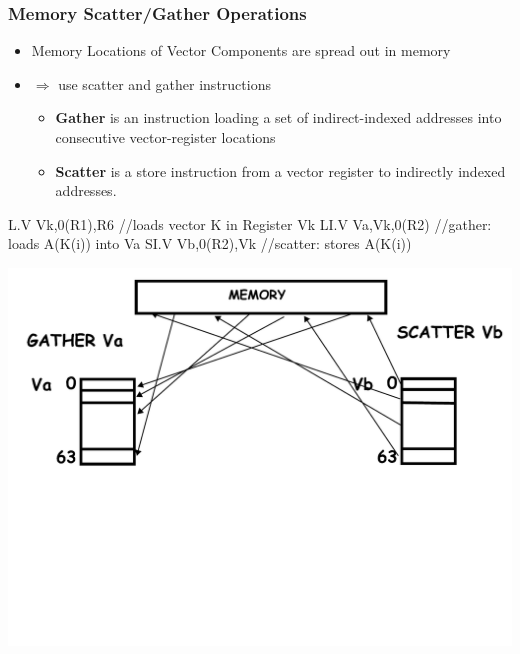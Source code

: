 \documentclass{beamer}
\newcommand{\emp}[1]{\textcolor{DikuRed}{ #1}}
\begin{document}
\begin{frame}[fragile,t]
\frametitle{Memory Scatter/Gather Operations}

\begin{itemize}
    \item Memory Locations of Vector Components are spread out in memory
    \item $\Rightarrow$ use scatter and gather instructions\medskip 
        \begin{itemize}
            \item \emp{\bf Gather} is an instruction loading a set of
                    indirect-indexed addresses into consecutive 
                    vector-register locations\smallskip
            \item \emp{\bf Scatter} is a store instruction from a vector
                    register to indirectly indexed addresses.
        \end  {itemize}
\end  {itemize}

\begin{colorcode}[fontsize=\scriptsize]
L.V   Vk,0(R1),R6  //loads vector K in Register Vk
LI.V  Va,Vk,0(R2)  //gather: loads A(K(i)) into Va
SI.V  Vb,0(R2),Vk  //scatter: stores A(K(i))
\end{colorcode}


\includegraphics[width=49ex]{Figures/VectScatterGather}

\end{frame}
\end{document}
